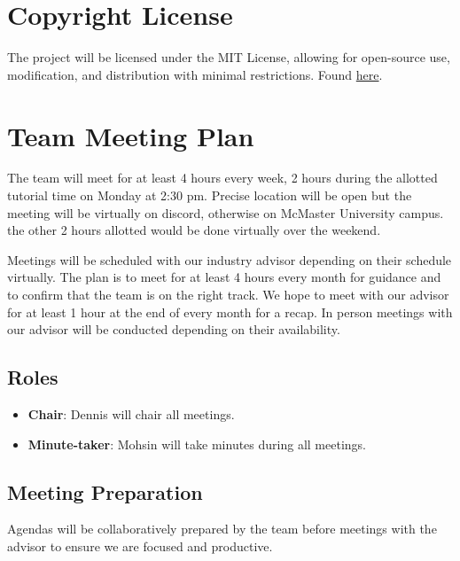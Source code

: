 \documentclass{article}
\begin{document}

\section{Copyright License}
The project will be licensed under the MIT License, allowing for open-source use, modification, 
and distribution with minimal restrictions. Found \href{https://github.com/lilweege/SyntaxSentinels/blob/main/LICENSE}{here}.

\section{Team Meeting Plan}

The team will meet for at least 4 hours every week, 2 hours during the allotted tutorial 
time on Monday at 2:30 pm. Precise location will be open but the meeting will be virtually on discord, 
otherwise on McMaster University campus. the other 2 hours allotted would be done virtually over the weekend.


Meetings will be scheduled with our industry advisor depending on their schedule virtually. 
The plan is to meet for at least 4 hours every month for guidance and to confirm that the team 
is on the right track. We hope to meet with our advisor for at least 1 hour at the end of every 
month for a recap. In person meetings with our advisor will be conducted depending on their availability.

\subsection*{Roles}

\begin{itemize}
    \item \textbf{Chair}: Dennis will chair all meetings.
    \item \textbf{Minute-taker}: Mohsin will take minutes during all meetings.
\end{itemize}

\subsection*{Meeting Preparation}

Agendas will be collaboratively prepared by the team before meetings with the advisor to 
ensure we are focused and productive.
\end{document}
